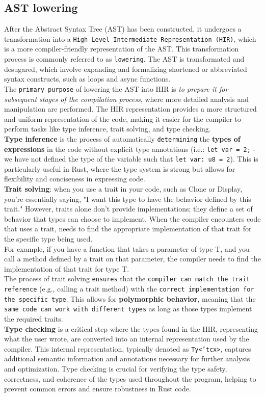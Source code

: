 \documentclass{article}
\begin{document}
\subsection{AST lowering}
After the Abstract Syntax Tree (AST) has been constructed, it undergoes a transformation into a \texttt{High-Level Intermediate Representation (HIR)}, which is a more compiler-friendly representation of the AST. This transformation process is commonly referred to as \texttt{lowering}. The AST is transformated and desugared, which involve expanding and formalizing shortened or abbreviated syntax constructs, such as loops and async functions.\\
The \texttt{primary purpose} of lowering the AST into HIR is \textit{to prepare it for subsequent stages of the compilation process}, where more detailed analysis and manipulation are performed. The HIR representation provides a more structured and uniform representation of the code, making it easier for the compiler to perform tasks like type inference, trait solving, and type checking.
\\\textbf{Type inference} is the process of automatically \texttt{determining} the \textbf{types of expressions} in the code without explicit type annotations (i.e.: \texttt{let var = 2;} - we have not defined the type of the variable such that \texttt{let var: u8 = 2}). This is particularly useful in Rust, where the type system is strong but allows for flexibility and conciseness in expressing code.
\\\textbf{Trait solving}: when you use a trait in your code, such as Clone or Display, you're essentially saying, "I want this type to have the behavior defined by this trait." However, traits alone don't provide implementations; they define a set of behavior that types can choose to implement. When the compiler encounters code that uses a trait, needs to find the appropriate implementation of that trait for the specific type being used. \\For example, if you have a function that takes a parameter of type T, and you call a method defined by a trait on that parameter, the compiler needs to find the implementation of that trait for type T.\\
The process of trait solving \texttt{ensures} that the \texttt{compiler can match the trait reference} (e.g., calling a trait method) with the \texttt{correct implementation for the specific type}. This allows for \textbf{polymorphic behavior}, meaning that the \texttt{same code can work with different types} as long as those types implement the required traits.
\\
\textbf{Type checking} is a critical step where the types found in the HIR, representing what the user wrote, are converted into an internal representation used by the compiler. This internal representation, typically denoted as \texttt{Ty<'tcx>}, captures additional semantic information and annotations necessary for further analysis and optimization. Type checking is crucial for verifying the type safety, correctness, and coherence of the types used throughout the program, helping to prevent common errors and ensure robustness in Rust code.
\end{document}
